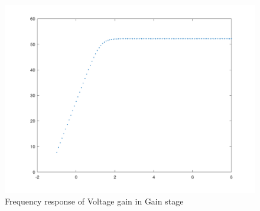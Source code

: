 \begin{figure} [!htb] 
  \includegraphics[width=\linewidth]{GAINVERDADEIRO.png}
  \caption{Frequency response of Voltage gain in Gain stage}
  \label{fig:theoplots}
  \endminipage\hfill
\end{figure}





